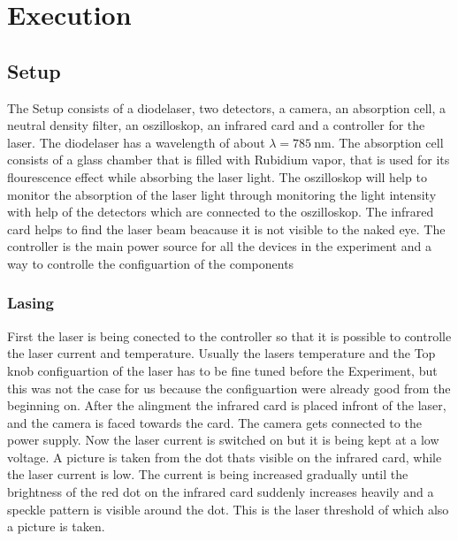 \section{Execution}
\label{sec:Durchführung}

\subsection{Setup}
The Setup consists of a diodelaser, two detectors, a camera, an absorption cell, a neutral density filter, an oszilloskop, an infrared card and a controller for the laser.
The diodelaser has a wavelength of about $\lambda = \SI{785}{\nano\meter}$.
The absorption cell consists of a glass chamber that is filled with Rubidium vapor, that is used for its flourescence effect while absorbing the laser light.
The oszilloskop will help to monitor the absorption of the laser light through monitoring the light intensity with help of the detectors which are connected to the oszilloskop.
The infrared card helps to find the laser beam beacause it is not visible to the naked eye.
The controller is the main power source for all the devices in the experiment and a way to controlle the configuartion of the components

\subsubsection{Lasing}
First the laser is being conected to the controller so that it is possible to controlle the laser current and temperature.
Usually the lasers temperature and the Top knob configuartion of the laser has to be fine tuned before the Experiment, but this was not the case for us because the configuartion were already good from the beginning on.
After the alingment the infrared card is placed infront of the laser, and the camera is faced towards the card.
The camera gets connected to the power supply.
Now the laser current is switched on but it is being kept at a low voltage.
A picture is taken from the dot thats visible on the infrared card, while the laser current is low.
The current is being increased gradually until the brightness of the red dot on the infrared card suddenly increases heavily and a speckle pattern is visible around the dot.
This is the laser threshold of which also a picture is taken.

